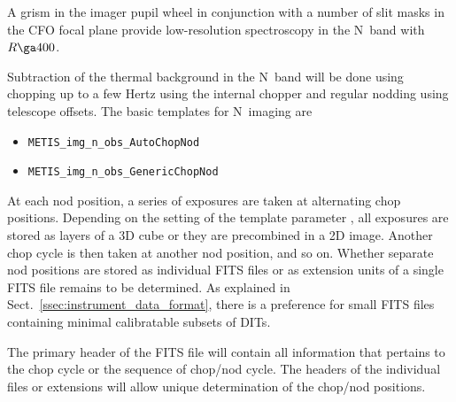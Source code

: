 A grism in the imager pupil wheel in conjunction with a number of slit
masks in the CFO focal plane provide low-resolution spectroscopy in
the N~band with $R\ga 400$.


Subtraction of the thermal background in the N~band will be done using
chopping up to a few Hertz using the internal chopper and regular nodding
using telescope offsets. The basic templates for N~imaging are
\begin{itemize}
\item \lstinline{METIS_img_n_obs_AutoChopNod}
\item \lstinline{METIS_img_n_obs_GenericChopNod}
\end{itemize}

At each nod position, a series of exposures are taken at alternating
chop positions. Depending on the setting of the template parameter
, all exposures are stored as layers of a 3D cube
or they are precombined in a 2D image. Another chop cycle is then
taken at another nod position, and so on. Whether separate nod
positions are stored as individual FITS files or as extension units of
a single FITS file remains to be determined. As explained in
Sect.~\ref{ssec:instrument_data_format}, there is a preference for
small FITS files containing minimal calibratable subsets of DITs.

The primary header of the FITS file will contain all information that
pertains to the chop cycle or the sequence of chop/nod cycle. The
headers of the individual files or extensions will allow unique
determination of the chop/nod positions.

